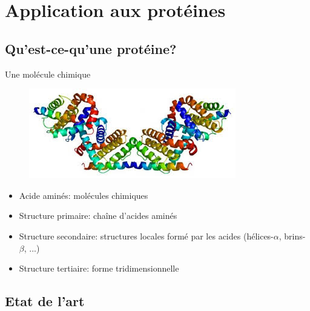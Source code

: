 \documentclass{beamer}
\begin{document}
\section{Application aux protéines}

\subsection{Qu'est-ce-qu'une protéine?}

\begin{frame}{Une molécule chimique}
  \begin{figure}
    \centering
    \includegraphics[scale=0.3]{../Figures/prot}
  \end{figure}
    \begin{itemize}
    \item Acide aminés: molécules chimiques
    \item Structure primaire: chaîne d'acides aminés
    \item Structure secondaire: structures locales formé par les acides
      (hélices-$\alpha$, brins-$\beta$, ...)
    \item Structure tertiaire: forme tridimensionnelle
    \end{itemize}
\end{frame}

\subsection{Etat de l'art}
\end{document}
